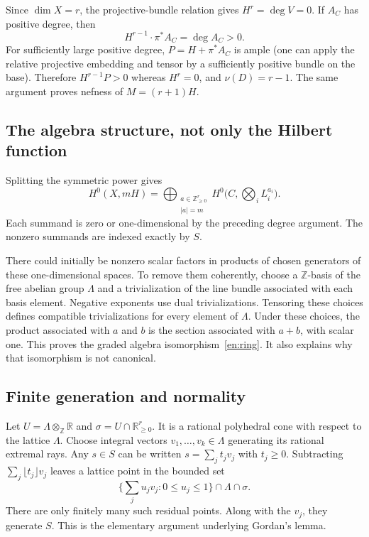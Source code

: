\documentclass[12pt]{amsart}
\theoremstyle{definition}
\theoremstyle{remark}
\numberwithin{equation}{section}
\newcommand{\R}{\mathbb{R}}
\newcommand{\Z}{\mathbb{Z}}
\newcommand{\NN}{\mathbb Z_{\geq0}}
\begin{document}
Since $\dim X=r$, the projective-bundle relation gives $H^r=\deg V=0$. If $A_C$ has positive degree, then
\[
 H^{r-1}\cdot\pi^*A_C=\deg A_C>0.
\]
For sufficiently large positive degree, $P=H+\pi^*A_C$ is ample (one can apply the relative projective embedding and tensor by a sufficiently positive bundle on the base). Therefore $H^{r-1}P>0$ whereas $H^r=0$, and $\nu(D)=r-1$. The same argument proves nefness of $M=(r+1)H$.

\subsection{The algebra structure, not only the Hilbert function}
Splitting the symmetric power gives
\begin{equation}\label{en:symmetric}
 H^0(X,mH)=
 \bigoplus_{\substack{a\in\NN^r\\ |a|=m}}
 H^0\bigl(C,\textstyle\bigotimes_i L_i^{a_i}\bigr).
\end{equation}
Each summand is zero or one-dimensional by the preceding degree argument. The nonzero summands are indexed exactly by $S$.

There could initially be nonzero scalar factors in products of chosen generators of these one-dimensional spaces. To remove them coherently, choose a $\Z$-basis of the free abelian group $\Lambda$ and a trivialization of the line bundle associated with each basis element. Negative exponents use dual trivializations. Tensoring these choices defines compatible trivializations for every element of $\Lambda$. Under these choices, the product associated with $a$ and $b$ is the section associated with $a+b$, with scalar one. This proves the graded algebra isomorphism~\eqref{en:ring}. It also explains why that isomorphism is not canonical.

\subsection{Finite generation and normality}
Let $U=\Lambda\otimes_\Z\R$ and $\sigma=U\cap\R_{\geq0}^r$. It is a rational polyhedral cone with respect to the lattice $\Lambda$. Choose integral vectors $v_1,\ldots,v_k\in\Lambda$ generating its rational extremal rays. Any $s\in S$ can be written $s=\sum_j t_jv_j$ with $t_j\geq0$. Subtracting $\sum_j\lfloor t_j\rfloor v_j$ leaves a lattice point in the bounded set
\[
 \bigl\{\textstyle\sum_j u_jv_j:0\leq u_j\leq1\bigr\}\cap\Lambda\cap\sigma.
\]
There are only finitely many such residual points. Along with the $v_j$, they generate $S$. This is the elementary argument underlying Gordan's lemma.
\end{document}
